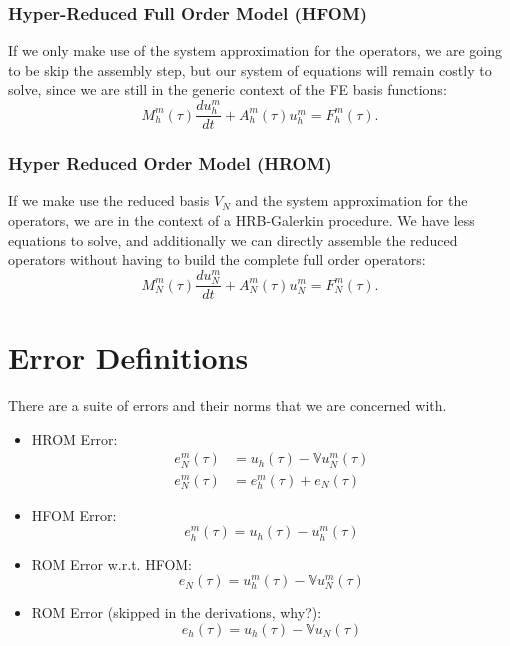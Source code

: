 \documentclass[../main.tex]{subfiles}
\begin{document}
\subsubsection{Hyper-Reduced Full Order Model (HFOM)}
If we only make use of the system approximation for the operators, we are going to be skip the assembly step, but our system of equations will remain costly to solve, since we are still in the generic context of the FE basis functions:
\begin{equation}
    M_h^m (\tau) \frac{d u_h^m}{dt} + A_h^m (\tau) u_h^m  = F_h^m(\tau).
\end{equation}

\subsubsection{Hyper Reduced Order Model (HROM)}
If we make use the reduced basis $V_N$ and the system approximation for the operators, we are in the context of a HRB-Galerkin procedure.
We have less equations to solve, and additionally we can directly assemble the reduced operators without having to build the complete full order operators:
\begin{equation}
    M_N^m (\tau) \frac{d u_N^m}{dt} + A_N^m (\tau) u_N^m  = F_N^m(\tau).
\end{equation}

\section{Error Definitions}
There are a suite of errors and their norms that we are concerned with.
\begin{itemize}
    \item HROM Error:
    \begin{align*}
        e_{N}^{m}(\tau) &= u_h(\tau) - \mathbb{V}u_N^m(\tau) \\
        e_{N}^{m}(\tau) &= e_{h}^{m}(\tau) + e_{N}(\tau)
    \end{align*}
    \item HFOM Error:
    \begin{equation}
        e_{h}^{m}(\tau) = u_h(\tau) - u_h^m(\tau)
    \end{equation}
    \item ROM Error w.r.t. HFOM:
    \begin{equation}
        e_{N}(\tau) = u_h^{m}(\tau) - \mathbb{V}u_N^m(\tau)
    \end{equation}
    \item ROM Error (skipped in the derivations, why?):
    \begin{equation}
        e_{h}(\tau) = u_h(\tau) - \mathbb{V}u_N(\tau)
    \end{equation}
\end{itemize}
\end{document}
